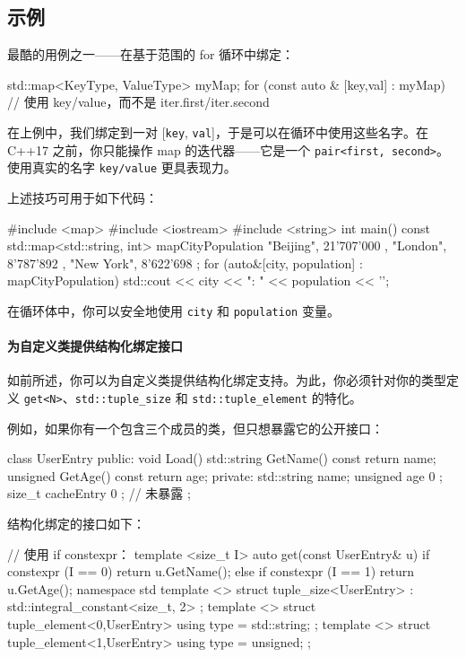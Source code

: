 \subsection{示例}

最酷的用例之一——在基于范围的 for 循环中绑定：

\begin{codebox}[cpp]
std::map<KeyType, ValueType> myMap;
for (const auto & [key,val] : myMap)
{
// 使用 key/value，而不是 iter.first/iter.second
}
\end{codebox}

在上例中，我们绑定到一对 [\texttt{key}, \texttt{val}]，于是可以在循环中使用这些名字。在 C++17 之前，你只能操作 map 的迭代器——它是一个 \texttt{pair<first, second>}。使用真实的名字 \texttt{key/value} 更具表现力。

上述技巧可用于如下代码：

\begin{codebox}[cpp]
#include <map>
#include <iostream>
#include <string>
int main()
{
const std::map<std::string, int> mapCityPopulation {
{ "Beijing", 21'707'000 },
{ "London", 8'787'892 },
{ "New York", 8'622'698 }
};
for (auto&[city, population] : mapCityPopulation)
std::cout << city << ": " << population << '\n';
}
\end{codebox}

在循环体中，你可以安全地使用 \texttt{city} 和 \texttt{population} 变量。

\paragraph{为自定义类提供结构化绑定接口}

如前所述，你可以为自定义类提供结构化绑定支持。为此，你必须针对你的类型定义 \texttt{get<N>}、\texttt{std::tuple\_size} 和 \texttt{std::tuple\_element} 的特化。

例如，如果你有一个包含三个成员的类，但只想暴露它的公开接口：

\begin{codebox}[cpp]
class UserEntry {
public:
void Load() { }
std::string GetName() const { return name; }
unsigned GetAge() const { return age; }
private:
std::string name;
unsigned age { 0 };
size_t cacheEntry { 0 }; // 未暴露
};
\end{codebox}

结构化绑定的接口如下：

\begin{codebox}[cpp]
// 使用 if constexpr：
template <size_t I> auto get(const UserEntry& u) {
if constexpr (I == 0) return u.GetName();
else if constexpr (I == 1) return u.GetAge();
}
namespace std {
template <> struct tuple_size<UserEntry> : std::integral_constant<size_t, 2> { };
template <> struct tuple_element<0,UserEntry> { using type = std::string; };
template <> struct tuple_element<1,UserEntry> { using type = unsigned; };
}
\end{codebox}

